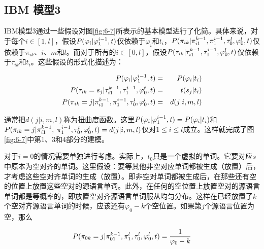 
\subsection{IBM 模型3}

\parinterval IBM模型3通过一些假设对图\ref{fig:6-7}所表示的基本模型进行了化简。具体来说，对于每个$i\in[1,l]$，假设${P}(\varphi_i |\varphi_1^{i-1},{t})$仅依赖于$\varphi_i$和$t_i$，${P}(\pi_{ik}|\pi_{i1}^{k-1},\pi_1^{i-1},\tau_0^l,\varphi_0^l,{t})$仅依赖于$\pi_{ik}$、$i$、$m$和$l$。而对于所有的$i\in[0,l]$，假设${P}(\tau_{ik}|\tau_{i1}^{k-1},\tau_1^{i-1},\varphi_0^l,{t})$仅依赖于$\tau_{ik}$和$t_i$。这些假设的形式化描述为：

\begin{eqnarray}
{P}(\varphi_i|\varphi_1^{i-1},{t})                                                              & = &{{P}(\varphi_i|t_i)} \label{eq:6-10} \\
{P}(\tau_{ik} = s_j |\tau_{i1}^{k-1},\tau_{1}^{i-1},\varphi_0^t,{t})             & = & t(s_j|t_i) \label{eq:6-11} \\
{P}(\pi_{ik} = j |\pi_{i1}^{k-1},\pi_{1}^{i-1},\tau_{0}^{l},\varphi_{0}^{l},{t}) & = & d(j|i,m,l) \label{eq:6-12}
\end{eqnarray}

\parinterval 通常把$d(j|i,m,l)$称为扭曲度函数。这里${P}(\varphi_i|\varphi_1^{i-1},{t})={{P}(\varphi_i|t_i)}$和${{P}(\pi_{ik}=j|\pi_{i1}^{k-1},}$ $\pi_{1}^{i-1},\tau_0^l,\varphi_0^l,{t})=d(j|i,m,l)$仅对$1 \le i \le l$成立。这样就完成了图\ref{fig:6-7}中第1、3和4部分的建模。

\parinterval 对于$i=0$的情况需要单独进行考虑。实际上，$t_0$只是一个虚拟的单词。它要对应${s}$中原本为空对齐的单词。这里假设：要等其他非空对应单词都被生成（放置）后，才考虑这些空对齐单词的生成（放置）。即非空对单词都被生成后，在那些还有空的位置上放置这些空对的源语言单词。此外，在任何的空位置上放置空对的源语言单词都是等概率的，即放置空对齐源语言单词服从均匀分布。这样在已经放置了$k$个空对齐源语言单词的时候，应该还有$\varphi_0-k$个空位置。如果第$j$个源语言位置为空，那么

\begin{equation}
{P}(\pi_{0k}=j|\pi_{01}^{k-1},\pi_1^l,\tau_0^l,\varphi_0^l,{t})=\frac{1}{\varphi_0-k}
\label{eq:6-13}
\end{equation}

